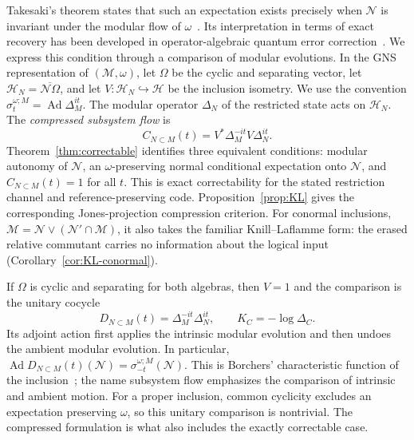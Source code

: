 \documentclass[a4paper,11pt]{article}
\theoremstyle{definition}
\begin{document}
Takesaki's theorem states that such an expectation exists precisely when $\mathcal N$ is invariant under the modular flow of $\omega$~\cite{Takesaki1972}. Its interpretation in terms of exact recovery has been developed in operator-algebraic quantum error correction~\cite{Faulkner2020}. We express this condition through a comparison of modular evolutions. In the GNS representation of $(\mathcal M,\omega)$, let $\Omega$ be the cyclic and separating vector, let $\mathcal H_N=\overline{\mathcal N\Omega}$, and let $V:\mathcal H_N\hookrightarrow\mathcal H$ be the inclusion isometry. We use the convention $\sigma_t^{\omega;M}=\operatorname{Ad}\Delta_M^{it}$. The modular operator $\Delta_N$ of the restricted state acts on $\mathcal H_N$. The \emph{compressed subsystem flow} is
\begin{equation}
 C_{N\subset M}(t)=V^*\Delta_M^{-it}V\Delta_N^{it}.
\end{equation}
Theorem~\ref{thm:correctable} identifies three equivalent conditions: modular autonomy of $\mathcal N$, an $\omega$-preserving normal conditional expectation onto $\mathcal N$, and $C_{N\subset M}(t)=1$ for all $t$. This is exact correctability for the stated restriction channel and reference-preserving code. Proposition~\ref{prop:KL} gives the corresponding Jones-projection compression criterion. For conormal inclusions, $\mathcal M=\mathcal N\vee(\mathcal N'\cap\mathcal M)$, it also takes the familiar Knill--Laflamme form: the erased relative commutant carries no information about the logical input (Corollary~\ref{cor:KL-conormal}).

If $\Omega$ is cyclic and separating for both algebras, then $V=1$ and the comparison is the unitary cocycle
\begin{equation}
 D_{N\subset M}(t)=\Delta_M^{-it}\Delta_N^{it},
 \qquad K_C=-\log\Delta_C.
 \label{eq:intro-subsystem-flow}
\end{equation}
Its adjoint action first applies the intrinsic modular evolution and then undoes the ambient modular evolution. In particular,
$\operatorname{Ad}D_{N\subset M}(t)(\mathcal N)=\sigma^{\omega;M}_{-t}(\mathcal N)$.
This is Borchers' characteristic function of the inclusion~\cite{revolutionizing}; the name subsystem flow emphasizes the comparison of intrinsic and ambient motion. For a proper inclusion, common cyclicity excludes an expectation preserving $\omega$, so this unitary comparison is nontrivial. The compressed formulation is what also includes the exactly correctable case.
\end{document}
